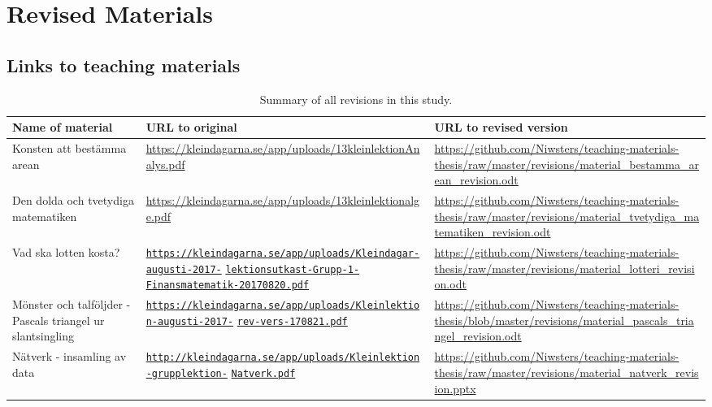 \chapter{Revised Materials}
\vspace{-1cm}
\section{Links to teaching materials}
\vspace{-0.5cm}
\bgroup
\def\arraystretch{1.5}
\begin{table}[H]
\begin{adjustwidth}{-2cm}{}
\centering
\caption{Summary of all revisions in this study.}
  \begin{tabular}{p{4.5cm}p{7cm}p{6.5cm}} \hline\hline
  \textbf{Name of material} & \textbf{URL to original} & \textbf{URL to revised version} \\ \hline
  Konsten att bestämma arean & \url{https://kleindagarna.se/app/uploads/13kleinlektionAnalys.pdf} & \url{https://github.com/Niwsters/teaching-materials-thesis/raw/master/revisions/material_bestamma_arean_revision.odt} \\ \hline
  Den dolda och tvetydiga matematiken & \url{https://kleindagarna.se/app/uploads/13kleinlektionalge.pdf} & \url{https://github.com/Niwsters/teaching-materials-thesis/raw/master/revisions/material_tvetydiga_matematiken_revision.odt} \\ \hline
  Vad ska lotten kosta? & \href{https://kleindagarna.se/app/uploads/Kleindagar-augusti-2017-lektionsutkast-Grupp-1-Finansmatematik-20170820.pdf}{\nolinkurl{https://kleindagarna.se/app/uploads/Kleindagar-augusti-2017-}} \href{https://kleindagarna.se/app/uploads/Kleindagar-augusti-2017-lektionsutkast-Grupp-1-Finansmatematik-20170820.pdf}{\nolinkurl{lektionsutkast-Grupp-1-}} \href{https://kleindagarna.se/app/uploads/Kleindagar-augusti-2017-lektionsutkast-Grupp-1-Finansmatematik-20170820.pdf}{\nolinkurl{Finansmatematik-20170820.pdf}}& \url{https://github.com/Niwsters/teaching-materials-thesis/raw/master/revisions/material_lotteri_revision.odt}\\ \hline
  Mönster och talföljder - Pascals triangel ur slantsingling & \href{https://kleindagarna.se/app/uploads/Kleinlektion-augusti-2017-rev-vers-170821.pdf}{\nolinkurl{https://kleindagarna.se/app/uploads/Kleinlektion-augusti-2017-}} \href{https://kleindagarna.se/app/uploads/Kleinlektion-augusti-2017-rev-vers-170821.pdf}{\nolinkurl{rev-vers-170821.pdf}} & \url{https://github.com/Niwsters/teaching-materials-thesis/blob/master/revisions/material_pascals_triangel_revision.odt} \\ \hline
  Nätverk - insamling av data & \href{http://kleindagarna.se/app/uploads/Kleinlektion-grupplektion-Natverk.pdf}{\nolinkurl{http://kleindagarna.se/app/uploads/Kleinlektion-grupplektion-}} \href{http://kleindagarna.se/app/uploads/Kleinlektion-grupplektion-Natverk.pdf}{\nolinkurl{Natverk.pdf}} & \url{https://github.com/Niwsters/teaching-materials-thesis/raw/master/revisions/material_natverk_revision.pptx}\\ \hline
\end{tabular}
\label{app:revisions}
\end{adjustwidth}
\end{table}
